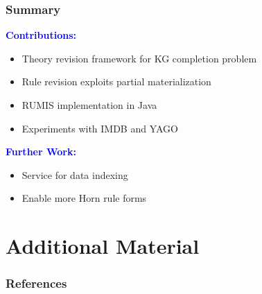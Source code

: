 \documentclass{beamer}
\newcommand{\bl}[1]{\textcolor{blue}{#1}}
\begin{document}
\begin{frame} \frametitle{Summary}
\textbf{\bl{Contributions:}}
\begin{itemize}
\item Theory revision framework for KG completion problem
\item Rule revision exploits partial materialization
\item RUMIS implementation in Java
\item Experiments with IMDB and YAGO
\end{itemize}
\bigskip
\bigskip

\textbf{\bl{Further Work:}}
\begin{itemize}
\item Service for data indexing
\item Enable more Horn rule forms
\end{itemize}
\end{frame}

\section{Additional Material}
\begin{frame}
  \frametitle{References}
  
 \tiny{}
\end{frame}
\end{document}
